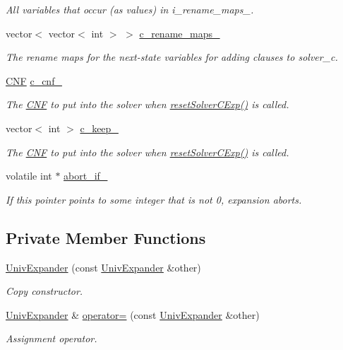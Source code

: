 \begin{DoxyCompactItemize}
\begin{DoxyCompactList}\small\item\em All variables that occur (as values) in i\-\_\-rename\-\_\-maps\-\_\-. \end{DoxyCompactList}\item 
vector$<$ vector$<$ int $>$ $>$ \hyperlink{classUnivExpander_ad16753edd5e204fac8e8a528f6667c33}{c\-\_\-rename\-\_\-maps\-\_\-}
\begin{DoxyCompactList}\small\item\em The rename maps for the next-\/state variables for adding clauses to solver\-\_\-c. \end{DoxyCompactList}\item 
\hyperlink{classCNF}{C\-N\-F} \hyperlink{classUnivExpander_af58b19991cb7aff5164af51f95ea6557}{c\-\_\-cnf\-\_\-}
\begin{DoxyCompactList}\small\item\em The \hyperlink{classCNF}{C\-N\-F} to put into the solver when \hyperlink{classUnivExpander_a27bb05f7f6a31a700d7407c45aebb6e8}{reset\-Solver\-C\-Exp()} is called. \end{DoxyCompactList}\item 
vector$<$ int $>$ \hyperlink{classUnivExpander_a048dabb0f36d29d4a709a3f284b60141}{c\-\_\-keep\-\_\-}
\begin{DoxyCompactList}\small\item\em The \hyperlink{classCNF}{C\-N\-F} to put into the solver when \hyperlink{classUnivExpander_a27bb05f7f6a31a700d7407c45aebb6e8}{reset\-Solver\-C\-Exp()} is called. \end{DoxyCompactList}\item 
volatile int $\ast$ \hyperlink{classUnivExpander_a6abb36bae418610456ed7a20d11c5f47}{abort\-\_\-if\-\_\-}
\begin{DoxyCompactList}\small\item\em If this pointer points to some integer that is not 0, expansion aborts. \end{DoxyCompactList}\end{DoxyCompactItemize}
\subsection*{Private Member Functions}
\begin{DoxyCompactItemize}
\item 
\hyperlink{classUnivExpander_a115738b6f2e3fcd8362d632a3fff4677}{Univ\-Expander} (const \hyperlink{classUnivExpander}{Univ\-Expander} \&other)
\begin{DoxyCompactList}\small\item\em Copy constructor. \end{DoxyCompactList}\item 
\hyperlink{classUnivExpander}{Univ\-Expander} \& \hyperlink{classUnivExpander_a263c8499565440575027b5d81c154bc6}{operator=} (const \hyperlink{classUnivExpander}{Univ\-Expander} \&other)
\begin{DoxyCompactList}\small\item\em Assignment operator. \end{DoxyCompactList}\end{DoxyCompactItemize}


